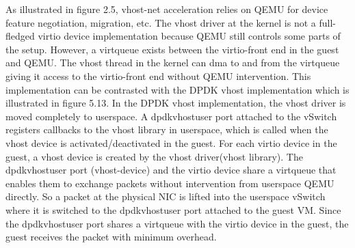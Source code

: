 As illustrated in figure 2.5, vhost-net acceleration relies on QEMU for device feature negotiation, migration, etc. The vhost driver at the kernel is not a full-fledged virtio device implementation because QEMU still controls some parts of the setup. However, a virtqueue exists between the virtio-front end in the guest and QEMU. The vhost thread in the kernel can \ac{dma} to and from the virtqueue giving it access to the virtio-front end without QEMU intervention. This implementation can be contrasted with the DPDK vhost implementation which is illustrated in figure 5.13. In the DPDK vhost implementation, the vhost driver is moved completely to userspace. A dpdkvhostuser port attached to the vSwitch registers callbacks to the vhost library in userspace, which is called when the vhost device is activated/deactivated in the guest. For each virtio device in the guest, a vhost device is created by the vhost driver(vhost library). The dpdkvhostuser port (vhost-device) and the virtio device share a virtqueue that enables them to exchange packets without intervention from userspace QEMU directly. So a packet at the physical NIC is lifted into the userspace vSwitch where it is switched to the dpdkvhostuser port attached to the guest VM. Since the dpdkvhostuser port shares a virtqueue with the virtio device in the guest, the guest receives the packet with minimum overhead.
